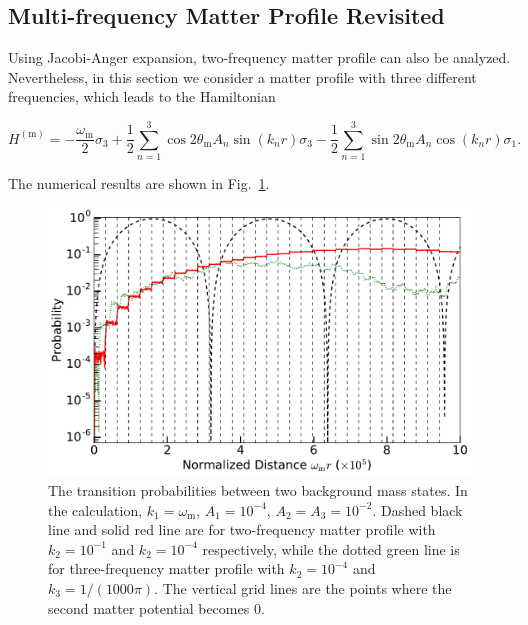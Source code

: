 \documentclass[%
reprint,
 amsmath,amssymb,
 prd,
]{revtex4-1}
\begin{document}
\subsection{Multi-frequency Matter Profile Revisited}


Using Jacobi-Anger expansion, two-frequency matter profile can also be analyzed. Nevertheless, in this section we consider a matter profile with three different frequencies, which leads to the Hamiltonian

\begin{widetext}
\begin{equation}
H^{(\mathrm m)} =  -\frac{\omega_{\mathrm{m}}}{2} \sigma_3 + \frac{1}{2} \sum_{n=1}^3 \cos 2\theta_{\mathrm m} A_n \sin (k_n r) \sigma_3  - \frac{1}{2} \sum_{n=1}^3 \sin 2\theta_{\mathrm m} A_n \cos (k_n r) \sigma_1 .
\label{eq-hamiltonian-rabi-three-frequency-interference-neutrino}
\end{equation}
\end{widetext}
The numerical results are shown in Fig.~\ref{fig-interference-reduction-three-modes-neutrino}.

\begin{figure}
    \includegraphics[width=\columnwidth]{assets/interference-reduction-three-modes-neutrino}
    \caption{The transition probabilities between two background mass states. In the calculation, $k_1=\omega_{\mathrm m}$, $A_1 = 10^{-4}$, $A_2=A_3=10^{-2}$. Dashed black line and solid red line are for two-frequency matter profile with $k_2=10^{-1}$ and $k_2=10^{-4}$ respectively, while the dotted green line is for three-frequency matter profile with $k_2=10^{-4}$ and $k_3=1/(1000\pi)$. The vertical grid lines are the points where the second matter potential becomes 0.}
    \label{fig-interference-reduction-three-modes-neutrino}
\end{figure}
\end{document}
